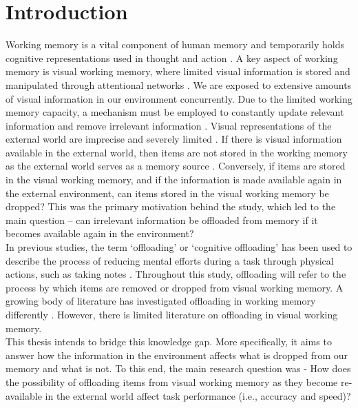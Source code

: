 \documentclass[
    a4paper,
    man,
    floatsintext,
    british
]{apa6}
\begin{document}
\section{Introduction}
Working memory is a vital component of human memory and temporarily holds cognitive representations used in thought and action \parencite{oberauer_2018_removal}. A key aspect of working memory is visual working memory, where limited visual information is stored and manipulated through attentional networks \parencite{gao_2016_objectbased}. We are exposed to extensive amounts of visual information in our environment concurrently. Due to the limited working memory capacity, a mechanism must be employed to constantly update relevant information and remove irrelevant information \parencite{lewispeacock_2018_the}. Visual representations of the external world are imprecise and severely limited \parencite{ramosgameiro_2017_exploration}. If there is visual information available in the external world, then items are not stored in the working memory as the external world serves as a memory source \parencite{ballard_1995_memory, somai_2020_evidence}. Conversely, if items are stored in the visual working memory, and if the information is made available again in the external environment, can items stored in the visual working memory be dropped? This was the primary motivation behind the study, which led to the main question – can irrelevant information be offloaded from memory if it becomes available again in the environment?
\\
In previous studies, the term ‘offloading’ or ‘cognitive offloading’ has been used to describe the process of reducing mental efforts during a task through physical actions, such as taking notes \parencite{morrison_2020_offloading}. Throughout this study, offloading will refer to the process by which items are removed or dropped from visual working memory. A growing body of literature has investigated offloading in working memory differently \parencite{dames_2022_, lintz_2021_refreshing, oberauer_2018_removal, shan_2022_the, vergauwe_2014_the}. However, there is limited literature on offloading in visual working memory. 
\\
This thesis intends to bridge this knowledge gap. More specifically, it aims to answer how the information in the environment affects what is dropped from our memory and what is not. To this end, the main research question was - How does the possibility of offloading items from visual working memory as they become re-available in the external world affect task performance (i.e., accuracy and speed)?
\end{document}
